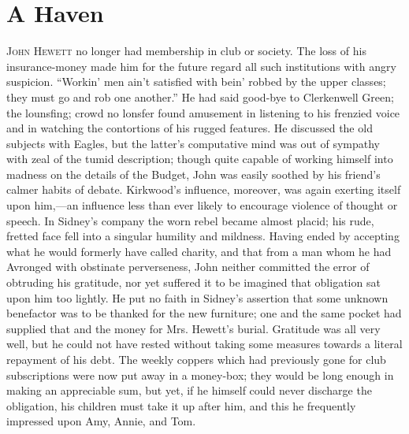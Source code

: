 \chapter{A Haven}

\textsc{John Hewett} no longer had membership in club or society. The
loss of his insurance-money made him for the future regard all such
institutions with angry suspicion. ``Workin' men ain't satisfied with
bein' robbed by the upper classes; they must go and rob one another.''
He had said good-bye to Clerkenwell Green; the lounsfing; crowd no
lonsfer found amusement in listening to his frenzied voice and in
watching the contortions of his rugged features. He discussed the old
subjects with Eagles, but the latter's computative mind was out of
sympathy with zeal of the tumid description; though quite capable of
working himself into madness on the details of the Budget, John was
easily soothed by his friend's calmer habits of debate. Kirkwood's
influence, moreover, was again exerting itself
{\protect\hypertarget{94}{}{}} upon him,---an influence less than ever
likely to encourage violence of thought or speech. In Sidney's company
the worn rebel became almost placid; his rude, fretted face fell into a
singular humility and mildness. Having ended by accepting what he would
formerly have called charity, and that from a man whom he had Avronged
with obstinate perverseness, John neither committed the error of
obtruding his gratitude, nor yet suffered it to be imagined that
obligation sat upon him too lightly. He put no faith in Sidney's
assertion that some unknown benefactor was to be thanked for the new
furniture; one and the same pocket had supplied that and the money for
Mrs. Hewett's burial. Gratitude was all very well, but he could not have
rested without taking some measures towards a literal repayment of his
debt. The weekly coppers which had previously gone for club
subscriptions were now put away in a money-box; they would be long
enough in making an appreciable sum, but yet, if he himself could never
discharge the obligation, his children must take it up after him, and
this he frequently impressed upon Amy, Annie, and Tom.

